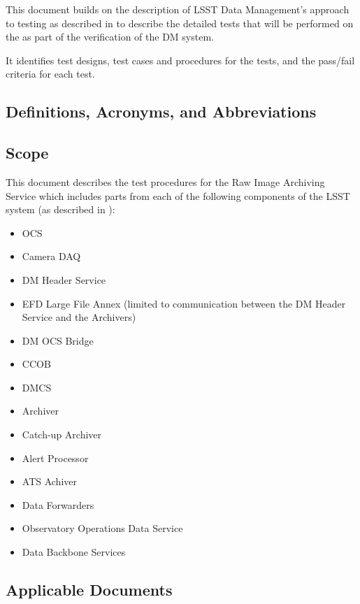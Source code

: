 \documentclass[DM,lsstdraft,STS,toc]{lsstdoc}
\begin{document}
This document builds on the description of LSST Data Management's
approach to testing as described in  to describe
the detailed tests that will be performed on the \product{} as part
of the verification of the DM system.


It identifies test designs, test cases and procedures for the tests,
and the pass/fail criteria for each test.

\subsection{Definitions, Acronyms, and Abbreviations \label{sec:acronyms}}


\subsection{Scope}
\label{sec:scope}


This document describes the test procedures for the Raw Image Archiving Service
which includes parts from each of the following components of the LSST system
(as described in ):


\begin{itemize}

\item{OCS}
\item{Camera DAQ}
\item{DM Header Service}
\item{EFD Large File Annex (limited to communication between the DM Header Service and the Archivers)}
\item{DM OCS Bridge}
\item{CCOB}
\item{DMCS}
\item{Archiver}
\item{Catch-up Archiver}
\item{Alert Processor}
\item{ATS Achiver}
\item{Data Forwarders}
\item{Observatory Operations Data Service}
\item{Data Backbone Services}


\end{itemize}


\subsection{Applicable Documents}
\label{sec:docs}
\end{document}
